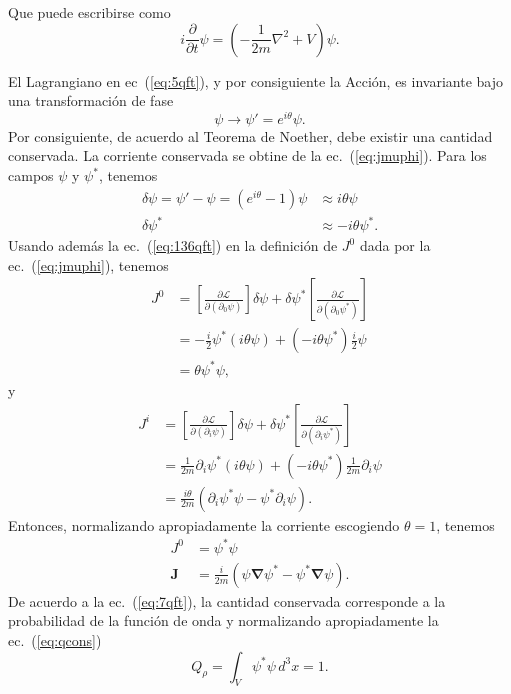 Que puede escribirse como
\begin{equation}
  \label{eq:133qft}
  i\frac{\partial}{\partial t}\psi=
  \left(
    -\frac{1}{2m}\nabla^2+V
  \right)\psi.
\end{equation}

El Lagrangiano en ec~(\ref{eq:5qft}), y por consiguiente la Acción, es invariante bajo una transformación de fase
\begin{equation}
  \label{eq:6qft}
  \psi\to\psi'=e^{i\theta}\psi.
\end{equation}
Por consiguiente, de acuerdo al Teorema de Noether, debe existir una cantidad conservada. La corriente conservada se obtine de la ec.~(\ref{eq:jmuphi}). Para los campos $\psi$ y $\psi^*$, tenemos
\begin{align}
  \delta\psi=\psi'-\psi=(e^{i\theta}-1)\psi&\approx i\theta\psi\\
  \delta\psi^*&\approx-i\theta\psi^*.
\end{align}
Usando además la ec.~(\ref{eq:136qft}) en la definición de $J^0$ dada por la ec.~(\ref{eq:jmuphi}), tenemos
\begin{align}
  \label{eq:135qft}
  J^0&=\left[\frac{\partial\mathcal{L}}{\partial(\partial_0\psi)}\right]\delta\psi
  +\delta\psi^*\left[\frac{\partial\mathcal{L}}{\partial(\partial_0\psi^*)}\right]\nonumber\\
  &=-\frac{i}{2}\psi^*(i\theta\psi)+(-i\theta\psi^*)\frac{i}{2}\psi\nonumber\\
  &=\theta\psi^*\psi,
\end{align}
y
\begin{align}
  \label{eq:134qft}
  J^i&=\left[\frac{\partial\mathcal{L}}{\partial(\partial_i\psi)}\right]\delta\psi
  +\delta\psi^*\left[\frac{\partial\mathcal{L}}{\partial(\partial_i\psi^*)}\right]\nonumber\\
  &=\frac{1}{2m}\partial_i\psi^*(i\theta\psi)+(-i\theta\psi^*)\frac{1}{2m}\partial_i\psi\nonumber\\
  &=\frac{i\theta}{2m}\left(\partial_i\psi^*\psi-\psi^*\partial_i\psi \right).
\end{align}
Entonces, normalizando apropiadamente la corriente escogiendo $\theta=1$, tenemos
\begin{align}
  \label{eq:7qft}
  J^0&=\psi^*\psi\\
  \mathbf{J}&=\frac{i}{2m}
  \left(
    \psi\boldsymbol{\nabla}\psi^*-\psi^*\boldsymbol{\nabla}\psi
  \right).
\end{align}
De acuerdo a la ec.~(\ref{eq:7qft}), la cantidad conservada corresponde a la probabilidad de la función de onda y normalizando apropiadamente la ec.~(\ref{eq:qcons})
\begin{equation}
  \label{eq:57qft}
Q_\rho=  \int_V \psi^*\psi \,d^3x=1.
\end{equation}

